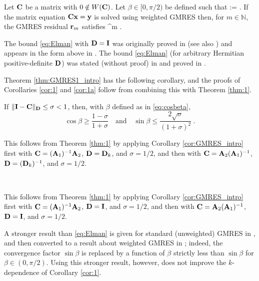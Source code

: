 
\begin{theorem}\label{thm:GMRES1_intro} 
Let $\mathbf{C}$ be a matrix with $0\notin W(\mathbf{C})$. Let $\beta\in[0,\pi/2)$ be defined such that
\beq\label{eq:cosbeta}
\cos \beta := .
\eeq
If the matrix equation $\mathbf{C} \mathbf{x} = \mathbf{y}$ is solved using weighted GMRES then, 
for $m\in \mathbb{N}$, the GMRES residual $\mathbf{r}_m$ %
satisfies
\beq\label{eq:Elman}
 \leq \sin^m \beta. %
\eeq
\end{theorem}
The bound \eqref{eq:Elman} with $\mathbf{D}=\mathbf{I}$ was originally proved in \cite{El:82} (see also \cite[Theorem 3.3]{EiElSc:83}) and appears in the form above in \cite[Equation 1.2]{BeGoTy:06}. The bound \eqref{eq:Elman} (for arbitrary Hermitian positive-definite $\mathbf{D}$) was stated (without proof) in \cite{CaWi:92} and proved in \cite[Theorem 5.1]{GrSpVa:17}. %



Theorem \ref{thm:GMRES1_intro} has the following corollary, and the proofs of Corollaries \ref{cor:1} and \ref{cor:1a} follow from combining this with Theorem \ref{thm:1}.

\begin{corollary}
\label{cor:GMRES_intro} 
If $\|\mathbf{I} - \mathbf{C} \|_{\mathbf{D}} \leq \sigma < 1$, then, with $\beta$ defined as in \eqref{eq:cosbeta},
$$\cos \beta \geq \frac{1-\sigma}{1+\sigma} \quad \text{and} \quad
\sin \beta \leq \frac{2 \sqrt{\sigma}}{(1+\sigma)^2} \ . $$
\end{corollary}

This follows from Theorem \ref{thm:1} by applying Corollary \ref{cor:GMRES_intro} first with $\mathbf{C}= (\mathbf{A}_{1})^{-1} \mathbf{A}_{2}$, $\mathbf{D}=\mathbf{D}_k$, and $\sigma=1/2$, and then with $\mathbf{C}= \mathbf{A}_{2}(\mathbf{A}_{1})^{-1} $, $\mathbf{D}=(\mathbf{D}_k)^{-1}$, and $\sigma=1/2$.
\epf

\

This follows from Theorem \ref{thm:1} by applying Corollary \ref{cor:GMRES_intro} first with $\mathbf{C}= (\mathbf{A}_{1})^{-1} \mathbf{A}_{2}$, $\mathbf{D}=\mathbf{I}$, and $\sigma=1/2$, and then with $\mathbf{C}= \mathbf{A}_{2}(\mathbf{A}_{1})^{-1} $, $\mathbf{D}=\mathbf{I}$, and $\sigma=1/2$.
\epf


A stronger result than \eqref{eq:Elman} is given for standard (unweighted) GMRES in \cite[Theorem 2.1]{BeGoTy:06}, and then converted to a result about weighted GMRES in \cite[Theorem 5.3]{BoDoGrSpTo:17}; indeed, the convergence factor $\sin \beta$ is replaced by a function of $\beta$ strictly less than $\sin\beta$ for $\beta\in (0,\pi/2)$. Using this stronger result, however, does not improve the $k$-dependence of Corollary \ref{cor:1}.
\ere


